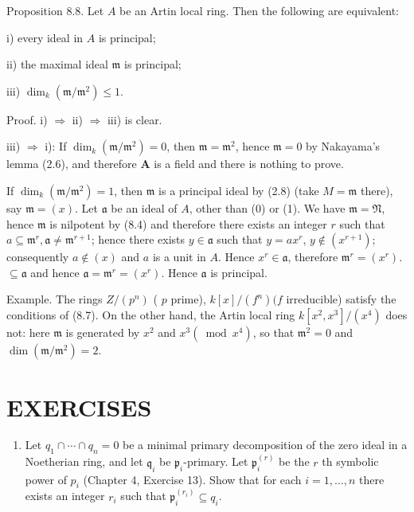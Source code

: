 \documentclass{standalone}
\theoremstyle{definition}
\theoremstyle{remark}
\begin{document}
Proposition 8.8. Let $A$ be an Artin local ring. Then the following are equivalent:

i) every ideal in $A$ is principal;

ii) the maximal ideal $\mathfrak{m}$ is principal;

iii) $\operatorname{dim}_{k}\left(\mathfrak{m} / \mathfrak{m}^{2}\right) \leqslant 1$.

Proof. i) $\Rightarrow$ ii) $\Rightarrow$ iii) is clear.

iii) $\Rightarrow$ i): If $\operatorname{dim}_{k}\left(\mathfrak{m} / \mathfrak{m}^{2}\right)=0$, then $\mathfrak{m}=\mathfrak{m}^{2}$, hence $\mathfrak{m}=0$ by Nakayama's lemma (2.6), and therefore $\boldsymbol{A}$ is a field and there is nothing to prove.

If $\operatorname{dim}_{k}\left(\mathfrak{m} / \mathfrak{m}^{2}\right)=1$, then $\mathfrak{m}$ is a principal ideal by (2.8) (take $M=\mathfrak{m}$ there), say $\mathfrak{m}=(x)$. Let $\mathfrak{a}$ be an ideal of $A$, other than (0) or (1). We have $\mathfrak{m}=\mathfrak{N}$, hence $\mathfrak{m}$ is nilpotent by (8.4) and therefore there exists an integer $r$ such that $a \subseteq \mathfrak{m}^{r}, \mathfrak{a} \neq \mathfrak{m}^{r+1}$; hence there exists $y \in \mathfrak{a}$ such that $y=a x^{r}$, $y \notin\left(x^{r+1}\right)$; consequently $a \notin(x)$ and $a$ is a unit in $A$. Hence $x^{r} \in \mathfrak{a}$, therefore $\mathfrak{m}^{r}=\left(x^{r}\right)$. $\subseteq \mathfrak{a}$ and hence $\mathfrak{a}=\mathfrak{m}^{r}=\left(x^{r}\right)$. Hence $\mathfrak{a}$ is principal.

Example. The rings $Z /\left(p^{n}\right)$ ( $p$ prime), $k[x] /\left(f^{n}\right)(f$ irreducible) satisfy the conditions of (8.7). On the other hand, the Artin local ring $k\left[x^{2}, x^{3}\right] /\left(x^{4}\right)$ does not: here $\mathfrak{m}$ is generated by $x^{2}$ and $x^{3}\left(\bmod x^{4}\right)$, so that $\mathfrak{m}^{2}=0$ and $\operatorname{dim}\left(\mathfrak{m} / \mathfrak{m}^{2}\right)=2$.

\section{EXERCISES}
\begin{enumerate}
  \item Let $q_{1} \cap \cdots \cap q_{n}=0$ be a minimal primary decomposition of the zero ideal in a Noetherian ring, and let $\mathfrak{q}_{i}$ be $\mathfrak{p}_{i}$-primary. Let $\mathfrak{p}_{i}^{(r)}$ be the $r$ th symbolic power of $p_{i}$ (Chapter 4, Exercise 13). Show that for each $i=1, \ldots, n$ there exists an integer $r_{i}$ such that $\mathfrak{p}_{i}^{\left(r_{i}\right)} \subseteq q_{i}$.
\end{enumerate}
\end{document}
